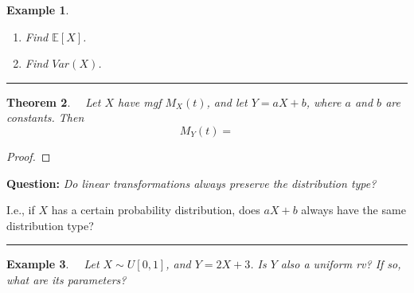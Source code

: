 \documentclass[12pt]{amsart}
\newtheorem{theorem}{Theorem}[section]
\newtheorem{example}[theorem]{Example}
\newcommand\Ebb{\mathbb{E}}
\newcommand\mgfX{M_X(t)}
\newcommand\mgfY{M_Y(t)}
\begin{document}
{\begin{example}
\begin{enumerate}
\vspace{6cm}

\item Find $\Ebb[X]$.

\vspace{4cm}

\item Find $Var(X)$.

\vspace{3cm}
\end{enumerate}

\end{example}

\vspace{.5cm}
\hrule
\vspace{.5cm}


\begin{theorem} \ \  Let $X$ have mgf $\mgfX$, and let $Y=aX+b$, where $a$ and $b$ are constants. Then
$$
\mgfY = 
$$
\end{theorem}

\begin{proof}
\end{proof}


\newpage

\textbf{Question:}\textit{ Do linear transformations always preserve the distribution type?} \newline

\vspace{.2cm}
I.e., if $X$ has a certain probability distribution, does $aX+b$  always have the same distribution type?

\vspace{.5cm}
\hrule
\vspace{.5cm}

\begin{example} \ \  Let $X \sim U[0,1]$, and $Y = 2X+3$. \newline Is $Y$ also a uniform rv? If so, what are its parameters? 


\end{example}

}
\end{document}
